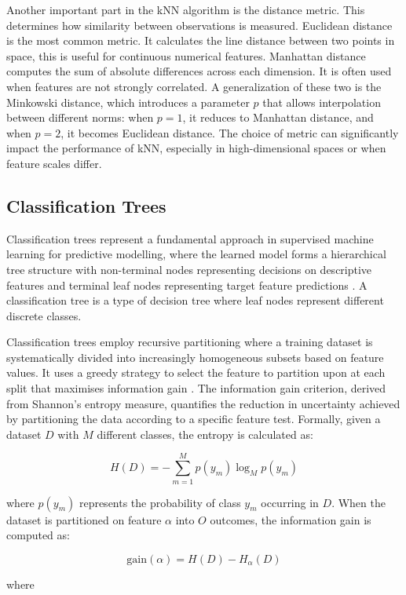 \documentclass[10pt, conference]{IEEEtran}
\begin{document}
Another important part in the kNN algorithm is the distance metric. This determines how similarity between observations is measured. Euclidean distance is the most common metric. It calculates the line distance between two points in space, this is useful for continuous numerical features. Manhattan distance computes the sum of absolute differences across each dimension. It is often used when features are not strongly correlated. A generalization of these two is the Minkowski distance, which introduces a parameter \(p\) that allows interpolation between different norms: when \(p = 1\), it reduces to Manhattan distance, and when \(p = 2\), it becomes Euclidean distance. The choice of metric can significantly impact the performance of kNN, especially in high-dimensional spaces or when feature scales differ.

\subsection{Classification Trees}
Classification trees represent a fundamental approach in supervised machine learning for predictive modelling, where the learned model forms a hierarchical tree structure with non-terminal nodes representing decisions on descriptive features and terminal leaf nodes representing target feature predictions \cite{quinlan1993c45}. A classification tree is a type of decision tree where leaf nodes represent different discrete classes.

Classification trees employ recursive partitioning where a training dataset is systematically divided into increasingly homogeneous subsets based on feature values. It uses a greedy strategy to select the feature to partition upon at each split that maximises information gain \cite{kelleher2020fundamentals}. The information gain criterion, derived from Shannon's entropy measure, quantifies the reduction in uncertainty achieved by partitioning the data according to a specific feature test.
Formally, given a dataset $D$ with $M$ different classes, the entropy is calculated as:

\[
H(D) = -\sum_{m=1}^{M} p(y_m) \log_{M} p(y_m)
\]

where $p(y_m)$ represents the probability of class $y_m$ occurring in $D$. When the dataset is partitioned on feature $\alpha$ into $O$ outcomes, the information gain is computed as:

\[
\text{gain}(\alpha) = H(D) - H_\alpha(D)
\]

where 
\end{document}
